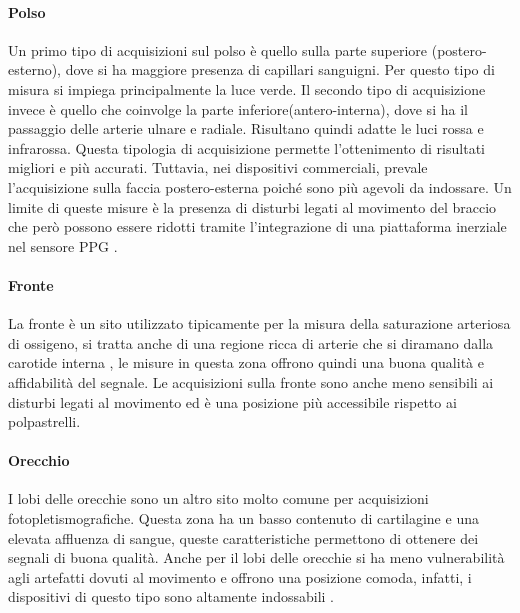 	 \paragraph{Polso}
	 Un primo tipo di acquisizioni sul polso è quello sulla parte superiore (postero-esterno), dove si ha maggiore presenza di capillari sanguigni. Per questo tipo di misura si impiega principalmente la luce verde.
	 Il secondo tipo di acquisizione invece è quello che coinvolge la parte inferiore(antero-interna), dove si ha il passaggio delle arterie ulnare e radiale. Risultano quindi adatte le luci rossa e infrarossa. Questa tipologia di acquisizione permette l'ottenimento di risultati migliori e più accurati.
	 Tuttavia, nei dispositivi commerciali, prevale l'acquisizione sulla faccia postero-esterna poiché sono più agevoli da indossare.
	 Un limite di queste misure è la presenza di disturbi legati al movimento del braccio che però possono essere ridotti tramite l'integrazione di una piattaforma inerziale nel sensore PPG \cite{Ghamari2018}.
	 \paragraph{Fronte}
 	 La fronte è un sito utilizzato tipicamente per la misura della saturazione arteriosa di ossigeno, si tratta anche di una regione ricca di arterie che si diramano dalla carotide interna \cite{Abay2019}, le misure in questa zona offrono quindi una buona qualità e affidabilità del segnale. Le acquisizioni sulla fronte sono anche meno sensibili ai disturbi legati al movimento ed è una posizione più accessibile rispetto ai polpastrelli.
 	 \paragraph{Orecchio}
	 I lobi delle orecchie sono un altro sito molto comune per acquisizioni fotopletismografiche. Questa zona ha un basso contenuto di cartilagine e una elevata affluenza di sangue, queste caratteristiche permettono di ottenere dei segnali di buona qualità. Anche per il lobi delle orecchie si ha meno vulnerabilità agli artefatti dovuti al movimento e offrono una posizione comoda, infatti, i dispositivi di questo tipo sono altamente indossabili \cite{Ghamari2018}\cite{Vescio2018}.

 